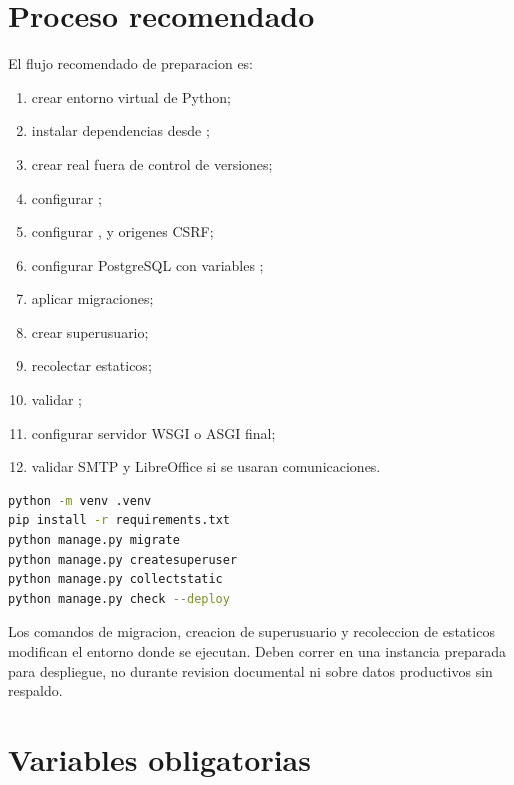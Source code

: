 \section{Proceso recomendado}
\label{sec:despliegue-proceso}

El flujo recomendado de preparacion es:

\begin{enumerate}
  \item crear entorno virtual de Python;
  \item instalar dependencias desde ;
  \item crear  real fuera de control de versiones;
  \item configurar ;
  \item configurar ,  y origenes CSRF;
  \item configurar PostgreSQL con variables ;
  \item aplicar migraciones;
  \item crear superusuario;
  \item recolectar estaticos;
  \item validar ;
  \item configurar servidor WSGI o ASGI final;
  \item validar SMTP y LibreOffice si se usaran comunicaciones.
\end{enumerate}

\begin{lstlisting}[language=bash,caption={Comandos base de despliegue Django.},label={lst:despliegue-comandos}]
python -m venv .venv
pip install -r requirements.txt
python manage.py migrate
python manage.py createsuperuser
python manage.py collectstatic
python manage.py check --deploy
\end{lstlisting}

\begin{advertencia}
Los comandos de migracion, creacion de superusuario y recoleccion de estaticos modifican el entorno donde se ejecutan. Deben correr en una instancia preparada para despliegue, no durante revision documental ni sobre datos productivos sin respaldo.
\end{advertencia}

\section{Variables obligatorias}
\label{sec:despliegue-variables}

